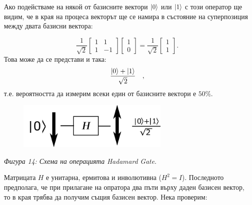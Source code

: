     Ако подействаме на някой от базисните вектори $\ket{0}$ или $\ket{1}$ с този оператор ще видим, че в края на процеса векторът ще се
    намира в състояние на суперпозиция между двата базисни вектора:

    \begin{equation}
        \frac{1}{\sqrt{2}} \begin{bmatrix}
            1 & 1\\
            1 & -1
        \end{bmatrix} \begin{bmatrix}
            1\\
            0
        \end{bmatrix} = \frac{1}{\sqrt{2}} \begin{bmatrix}
            1\\
            1
        \end{bmatrix}.
    \end{equation}
    Това може да се представи и така:
    \begin{equation}
        \frac{\ket{0} +\ket{1}}{\sqrt{2}} \quad ,
    \end{equation}
    т.е. вероятността да измерим всеки един от базисните вектори е $50\%$.

    \begin{figure}[H]
        \centering
        \includegraphics[width=210pt]{15.png}
    \end{figure}
    \begin{center}
        \small \textit{Фигура 14: Схема на операцията Hadamard Gate.}
    \end{center}

    Матрицата $H$ е унитарна, ермитова и инволютивна ($H^2 = \textit{I}$). Последното предполага, че при прилагане на опратора два пъти върху
    даден базисен вектор, то в края трябва да получим същия базисен вектор. Нека проверим:

